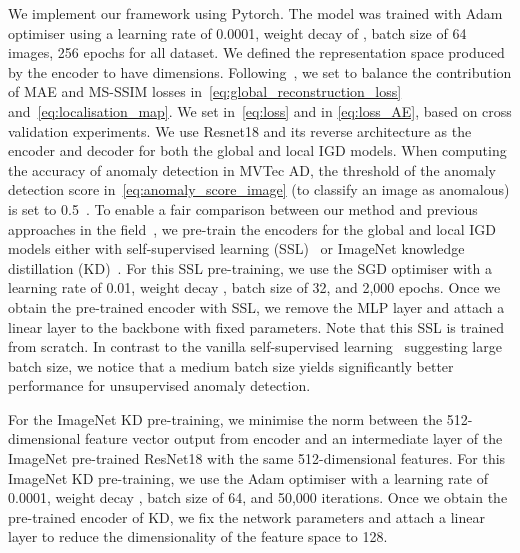 \documentclass[letterpaper]{article} \usepackage{aaai22}  \usepackage{times}  \usepackage{helvet}  \usepackage{courier}  \usepackage[hyphens]{url}  \usepackage{graphicx} \urlstyle{rm} \def\UrlFont{\rm}  \usepackage{natbib}  \usepackage{caption} \DeclareCaptionStyle{ruled}{labelfont=normalfont,labelsep=colon,strut=off} \frenchspacing  \setlength{\pdfpagewidth}{8.5in}  \setlength{\pdfpageheight}{11in}  \usepackage{algorithm}
\begin{document}
We implement our framework using Pytorch. The model was trained with Adam optimiser using a learning rate of 0.0001, weight decay of , batch size of 64 images, 256 epochs for all dataset. We defined the representation space produced by the encoder to have  dimensions.
Following~\cite{depthestimation2017}, we set  to balance the contribution of MAE and MS-SSIM losses in~\eqref{eq:global_reconstruction_loss} and~\eqref{eq:localisation_map}. 
We set  in~\eqref{eq:loss} and   in \eqref{eq:loss_AE}, based on cross validation experiments. We use Resnet18 and its reverse architecture as the encoder and decoder for both the global and local IGD models. 
When computing the accuracy of anomaly detection in MVTec AD, the threshold of the anomaly detection score  in~\eqref{eq:anomaly_score_image} (to classify an image as anomalous) is set to 0.5~\cite{venkataramanan2019attention}.
To enable a fair comparison between our method and previous approaches in the field~\cite{bergmann2020uninformed,venkataramanan2019attention,bergman2020classification,golan2018deep}, we pre-train the encoders for the global and local IGD models either with self-supervised learning (SSL)~\cite{chen2020simple}
or ImageNet knowledge distillation (KD)~\cite{bergmann2020uninformed,gou2020knowledge}. 
For this SSL pre-training, we use the SGD optimiser with a learning rate of 0.01,  weight decay , batch size of 32, and 2,000 epochs. Once we obtain the pre-trained encoder with SSL, we remove the MLP layer and attach a linear layer to the backbone with fixed parameters. Note that this SSL is trained from scratch. 
In contrast to the vanilla self-supervised learning~\cite{chen2020simple} suggesting large batch size, we notice that a medium batch size yields significantly better performance for unsupervised anomaly detection. 


For the ImageNet KD pre-training, we minimise the  norm between the 512-dimensional feature vector output from encoder and an intermediate layer of the ImageNet pre-trained ResNet18 with the same 512-dimensional features.
For this ImageNet KD pre-training, we use the Adam optimiser with a learning rate of 0.0001,  weight decay , batch size of 64, and 50,000 iterations. Once we obtain the pre-trained encoder of KD, we fix the network parameters 
and attach a linear layer to reduce the dimensionality of the feature space to 128.
\end{document}
